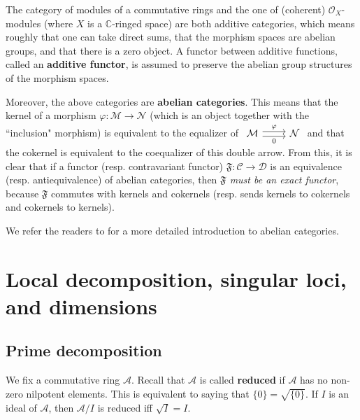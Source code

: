 \documentclass[12pt,b5paper,notitlepage]{report}
\theoremstyle{definition}
\theoremstyle{plain}
\newcommand{\fk}{\mathfrak}
\newcommand{\mc}{\mathcal}
\newcommand{\scr}{\mathscr}
\newcommand{\Cbb}{\mathbb C}
\numberwithin{equation}{section}
\begin{document}
\begin{subappendices}
The category of modules of a commutative rings and the one of (coherent) $\scr O_X$-modules (where $X$ is a $\Cbb$-ringed space) are both additive categories, which means roughly that one can take direct sums,  that the morphism spaces are abelian groups, and that there is a zero object. A functor between additive functions, called an \textbf{additive functor}, is assumed to preserve the abelian group structures of the morphism spaces. 

Moreover, the above categories are \textbf{abelian categories}. This means that the kernel of a morphism $\varphi:\mc M\rightarrow\mc N$ (which is an object together with the ``inclusion" morphism) is equivalent to the equalizer of $\begin{tikzcd}
\mc M \arrow[r,shift left, "\varphi"] \arrow[r,shift right,"0"'] & \mc N
\end{tikzcd}$
and that the cokernel is equivalent to the coequalizer of this double arrow. From this, it is clear that if a functor (resp. contravariant functor) $\fk F:\mc C\rightarrow\mc D$ is an equivalence (resp. antiequivalence) of abelian categories, then {\color{red}\textit{$\fk F$ must be an exact functor}}, because $\fk F$ commutes with kernels and cokernels (resp. sends kernels to cokernels and cokernels to kernels).



We refer the readers to \cite[Chapter 1]{Vak17} for a more detailed introduction to abelian categories.






\end{subappendices}












\chapter{Local decomposition, singular loci, and dimensions}



\section{Prime decomposition}

We fix a commutative ring $\mc A$. Recall that $\mc A$ is called \textbf{reduced}  if $\mc A$ has no non-zero nilpotent elements. This is equivalent to saying that $\{0\}=\sqrt{\{0\}}$. If $I$ is an ideal of $\mc A$, then $\mc A/I$ is reduced iff $\sqrt{I}=I$.
\end{document}
